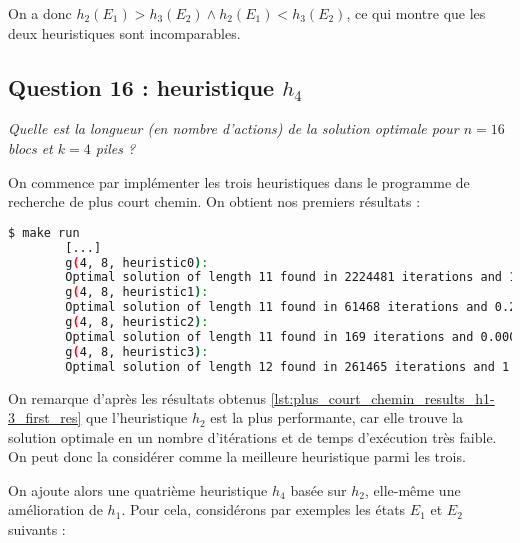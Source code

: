 On a donc $h_2(E_1) > h_3(E_2) \land h_2(E_1) < h_3(E_2)$, ce qui montre que les deux heuristiques sont incomparables.

\subsection{Question 16 : heuristique $h_4$}

\textit{Quelle est la longueur (en nombre d'actions) de la solution optimale pour $n = 16$ blocs et $k = 4 $ piles ?}

On commence par implémenter les trois heuristiques dans le programme de recherche de plus court chemin. On obtient nos premiers résultats :

\begin{minipage}{\dimexpr\linewidth-20pt}
    \begin{lstlisting}[language=bash, caption={Résultats de l'exécution du programme de recherche de plus court chemin avec 3 premières heuristiques pour $k = 4$ piles et $n = 8$ blocs.}, label={lst:plus_court_chemin_results_h1-3_first_res}]
        $ make run
        [...]
        g(4, 8, heuristic0): 
        Optimal solution of length 11 found in 2224481 iterations and 15.1703 seconds
        g(4, 8, heuristic1): 
        Optimal solution of length 11 found in 61468 iterations and 0.242329 seconds
        g(4, 8, heuristic2): 
        Optimal solution of length 11 found in 169 iterations and 0.000934 seconds
        g(4, 8, heuristic3): 
        Optimal solution of length 12 found in 261465 iterations and 1.12496 seconds
    \end{lstlisting}
\end{minipage}

On remarque d'après les résultats obtenus \ref{lst:plus_court_chemin_results_h1-3_first_res} que l'heuristique $h_2$ est la plus performante, car elle trouve la solution optimale en un nombre d'itérations et de temps d'exécution très faible. On peut donc la considérer comme la meilleure heuristique parmi les trois.

On ajoute alors une quatrième heuristique $h_4$ basée sur $h_2$, elle-même une amélioration de $h_1$. Pour cela, considérons par exemples les états $E_1$ et $E_2$ suivants :

